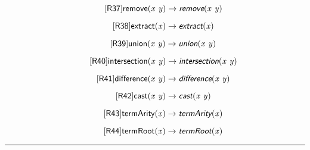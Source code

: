 \documentclass[10pt,leqno,fleqn]{article}
\newcommand{\artVariable}[1]{\mbox{\em #1\/}}
\newcommand{\artConstructor}[1]{\mbox{\sf #1}}
\newcommand{\artSpecial}[1]{\mbox{\sf\em #1}}
\begin{document}
\begin{equation}
\tag*{[\artConstructor{\sf R37}]}\artConstructor{\sf remove}(\artVariable{x}\ \artVariable{y})\rightarrow \artSpecial{remove}(\artVariable{x}\ \artVariable{y})
\end{equation}

\begin{equation}
\tag*{[\artConstructor{\sf R38}]}\artConstructor{\sf extract}(\artVariable{x})\rightarrow \artSpecial{extract}(\artVariable{x})
\end{equation}

\begin{equation}
\tag*{[\artConstructor{\sf R39}]}\artConstructor{\sf union}(\artVariable{x}\ \artVariable{y})\rightarrow \artSpecial{union}(\artVariable{x}\ \artVariable{y})
\end{equation}

\begin{equation}
\tag*{[\artConstructor{\sf R40}]}\artConstructor{\sf intersection}(\artVariable{x}\ \artVariable{y})\rightarrow \artSpecial{intersection}(\artVariable{x}\ \artVariable{y})
\end{equation}

\begin{equation}
\tag*{[\artConstructor{\sf R41}]}\artConstructor{\sf difference}(\artVariable{x}\ \artVariable{y})\rightarrow \artSpecial{difference}(\artVariable{x}\ \artVariable{y})
\end{equation}

\begin{equation}
\tag*{[\artConstructor{\sf R42}]}\artConstructor{\sf cast}(\artVariable{x}\ \artVariable{y})\rightarrow \artSpecial{cast}(\artVariable{x}\ \artVariable{y})
\end{equation}

\begin{equation}
\tag*{[\artConstructor{\sf R43}]}\artConstructor{\sf termArity}(\artVariable{x})\rightarrow \artSpecial{termArity}(\artVariable{x})
\end{equation}

\begin{equation}
\tag*{[\artConstructor{\sf R44}]}\artConstructor{\sf termRoot}(\artVariable{x})\rightarrow \artSpecial{termRoot}(\artVariable{x})
\end{equation}

\hrule
\end{document}
